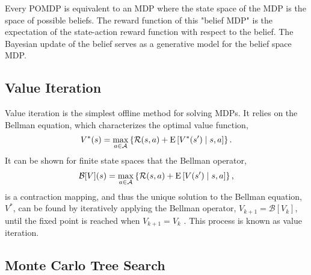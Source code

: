 Every POMDP is equivalent to an MDP where the state space of the MDP is the space of possible beliefs.
The reward function of this "belief MDP" is the expectation of the state-action reward function with respect to the belief.
The Bayesian update of the belief serves as a generative model for the belief space MDP.

\subsection{Value Iteration}

Value iteration is the simplest offline method for solving MDPs.
It relies on the Bellman equation, which characterizes the optimal value function,
\begin{equation}
    V^*(s) = \max_{a \in \mathcal{A}} \left\{\mathcal{R}(s,a) + \text{E}\left[V^*(s') \mid s, a \right]\right\} \text{.}
\end{equation}
It can be shown for finite state spaces that the Bellman operator,
\begin{equation}
    \mathcal{B}[V](s) = \max_{a \in \mathcal{A}} \left\{\mathcal{R}(s,a) + \text{E} \left[V(s') \mid s, a \right] \right\} \text{,}
\end{equation}
is a contraction mapping, and thus the unique solution to the Bellman equation, $V^*$, can be found by iteratively applying the Bellman operator, $V_{k+1} = \mathcal{B}[V_k]$, until the fixed point is reached when $V_{k+1} = V_k$ \cite{DB:05}.
This process is known as value iteration.

\subsection{Monte Carlo Tree Search} \label{sec:mcts}

